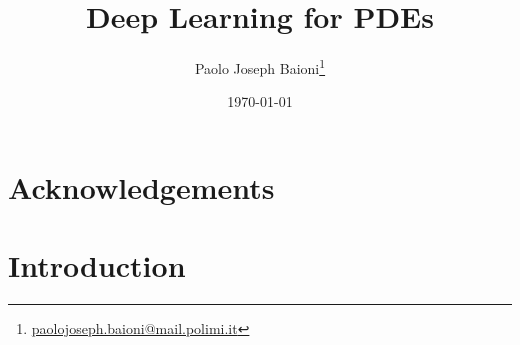 \documentclass[12pt, a4paper]{report}
\title{\textbf{Deep Learning for PDEs}}
\author{Paolo Joseph Baioni\renewcommand{\thefootnote}{\fnsymbol{footnote}}\footnote{\href{mailto:paolojoseph.baioni@mail.polimi.it}{paolojoseph.baioni@mail.polimi.it}}}
\date{\today}
\theoremstyle{definition}
\begin{document}
	
\maketitle

	
	

\chapter*{Acknowledgements}


	
\tableofcontents
\clearpage
	

\chapter*{Introduction}
\end{document}
